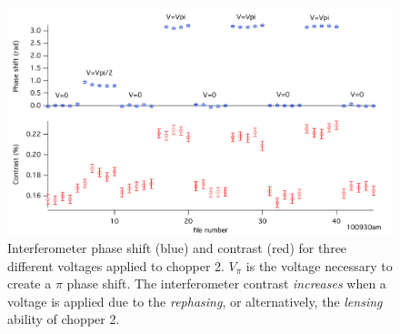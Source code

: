 \begin{figure}
\includegraphics[width=1\textwidth]{Figures/contrastIncrease.pdf}
\caption[Unexpected increase in interferometer contrast due to energizing phase chopper 2.]{\label{c2dcIncrease}Interferometer phase shift (blue) and contrast (red) for three different voltages applied to chopper 2. $V_\pi$ is the voltage necessary to create a $\pi$ phase shift. The interferometer contrast \emph{increases} when a voltage is applied due to the \emph{rephasing}, or alternatively, the \emph{lensing} ability of chopper 2.}
\end{figure}


